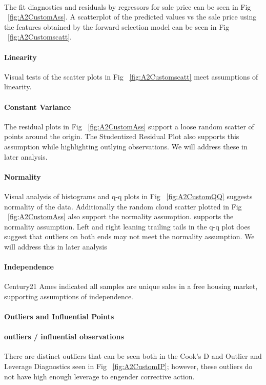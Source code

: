 \documentclass[11pt]{scrartcl} %
\begin{document}
\paragraph{} The fit diagnostics and residuals by regressors for sale price can be seen in Fig ~\ref{fig:A2CustomAss}. A scatterplot of the predicted values vs the sale price using the features obtained by the forward selection model can be seen in Fig ~\ref{fig:A2Customscatt}.
\paragraph{Linearity} Visual tests of the scatter plots in Fig ~\ref{fig:A2Customscatt} meet assumptions of linearity.
\paragraph{Constant Variance} The residual plots in Fig ~\ref{fig:A2CustomAss} support a loose random scatter of points around the origin. The Studentized Residual Plot also supports this assumption while highlighting outlying observations. We will address these in later analysis.
\paragraph{Normality} Visual analysis of histograms and q-q plots in Fig ~\ref{fig:A2CustomQQ} suggests normality of the data. Additionally the random cloud scatter plotted in Fig ~\ref{fig:A2CustomAss} also support the normality assumption. supports the normality assumption. Left and right leaning trailing tails in the q-q plot does suggest that outliers on both ends may not meet the normality assumption. We will address this in later analysis
\paragraph{Independence} Century21 Ames indicated all samples are unique sales in a free housing market, supporting assumptions of independence. 
\paragraph{Outliers and Influential Points}
\paragraph{outliers / influential observations} There are distinct outliers that can be seen both in the Cook's D and Outlier and Leverage Diagnostics seen in Fig ~\ref{fig:A2CustomIP}; however, these outliers do not have high enough leverage to engender corrective action.
\end{document}
